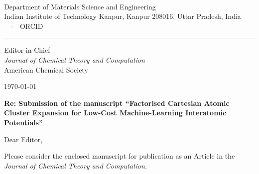 \documentclass[11pt]{article}
\begin{document}
{\large\bfseries \AuthorName}\\[2pt]
Department of Materials Science and Engineering\\
Indian Institute of Technology Kanpur, Kanpur 208016, Uttar Pradesh, India\\
\AuthorEmail\ \ $\cdot$\ \ ORCID \AuthorORCID

\vspace{-4pt}
{\color{black!60}\rule{\textwidth}{0.4pt}}

\begin{minipage}[t]{0.6\textwidth}
Editor-in-Chief\\
\emph{Journal of Chemical Theory and Computation}\\
American Chemical Society
\end{minipage}\hfill
\begin{minipage}[t]{0.35\textwidth}\raggedleft
\today
\end{minipage}

\textbf{Re: Submission of the manuscript ``Factorised Cartesian Atomic Cluster Expansion for Low-Cost
Machine-Learning Interatomic Potentials''}

Dear Editor,

Please consider the enclosed manuscript for publication as an Article in the \emph{Journal of Chemical Theory and
Computation}.
\end{document}
